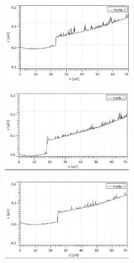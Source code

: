 \documentclass{jsarticle}
\begin{document}
\begin{figure}[htbp]
 \begin{minipage}{0.5\hsize}
  \begin{center}
   \includegraphics[width=70mm,height=35mm]{pictures/05.jpg}
  \end{center}
  \label{fig:one}
 \end{minipage}
 \begin{minipage}{0.5\hsize}
  \begin{center}
   \includegraphics[width=70mm,height=35mm]{pictures/06.jpg}
  \end{center}
  \label{fig:two}
 \end{minipage}
\end{figure}
\begin{figure}[htbp]
 \begin{center}
  \includegraphics[width=70mm,height=35mm]{pictures/07.jpg}
 \end{center}
 \label{fig:one}
\end{figure}
\ 
\end{document}
